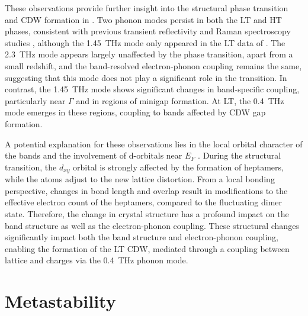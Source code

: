 These observations provide further insight into the structural phase transition and CDW formation in .
Two phonon modes persist in both the LT and HT phases, consistent with previous transient reflectivity and Raman spectroscopy studies \cite{hu_optical_2022, luo_subtle_2021}, although the \qty{1.45}{\tera\hertz} mode only appeared in the LT data of \cite{hu_optical_2022}.
The \qty{2.3}{\tera\hertz} mode appears largely unaffected by the phase transition, apart from a small redshift, and the band-resolved electron-phonon coupling remains the same, suggesting that this mode does not play a significant role in the transition.
In contrast, the \qty{1.45}{\tera\hertz} mode shows significant changes in band-specific coupling, particularly near $\Gamma$ and in regions of minigap formation.
At LT, the \qty{0.4}{\tera\hertz} mode emerges in these regions, coupling to bands affected by CDW gap formation.

A potential explanation for these observations lies in the local orbital character of the bands and the involvement of  d-orbitals near $E_F$ \cite{mitsuishi_unveiling_2024}.
During the structural transition, the  $d_{xy}$ orbital is strongly affected by the formation of heptamers, while the  atoms adjust to the new lattice distortion.
From a local bonding perspective, changes in bond length and overlap result in modifications to the effective electron count of the heptamers, compared to the fluctuating dimer state.
Therefore, the change in crystal structure has a profound impact on the band structure as well as the electron-phonon coupling.
These structural changes significantly impact both the band structure and electron-phonon coupling, enabling the formation of the LT CDW, mediated through a coupling between lattice and charges via the \qty{0.4}{\tera\hertz} phonon mode.

\section{Metastability}
\label{sec:meta}

